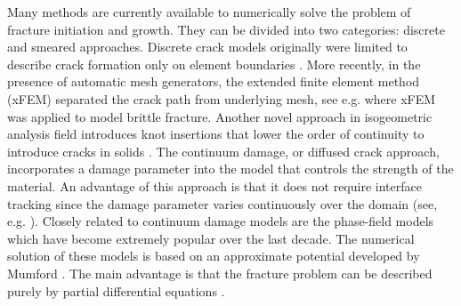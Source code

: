 \documentclass[11pt]{ACMEarticle}
\numberwithin{equation}{section}
\begin{document}
Many methods are currently available to numerically solve the problem of fracture initiation and growth. They can be divided into two categories: discrete and smeared approaches. Discrete crack models originally were limited to describe crack formation only on element boundaries \citep{Scordelis1967}. More recently, in the presence of automatic mesh generators, the extended finite element method (xFEM) separated the crack path from underlying mesh, see e.g. \citep{Belytschko1999} where xFEM was applied to model brittle fracture. Another novel approach in isogeometric analysis field introduces knot insertions that lower the order of continuity to introduce cracks in solids \citep{Hosseini2014}. The continuum damage, or diffused crack approach, incorporates a damage parameter into the model that controls the strength of the material. An advantage of this approach is that it does not require interface tracking since the damage parameter varies continuously over the domain (see, e.g. \citep{deBorst2004}). Closely related to continuum damage models are the phase-field models which have become extremely popular over the last decade. The numerical solution of these models is based on an approximate potential developed by Mumford \citep{Mumford1989}. The main advantage is that the fracture problem can be described purely by partial differential equations \citep{Miehe2010a,Borst2014}. \\
\end{document}
